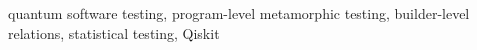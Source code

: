 \documentclass[10pt,conference]{IEEEtran}
\begin{document}
\begin{IEEEkeywords}
quantum software testing, program-level metamorphic testing, builder-level relations, statistical testing, Qiskit
\end{IEEEkeywords}








% 



\end{document}
